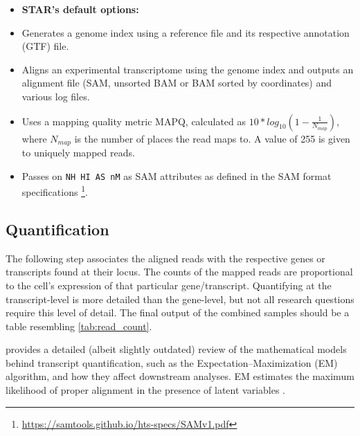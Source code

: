 
\begin{itemize}\itemsep0em
\item[] \textbf{STAR's default options:}
\item Generates a genome index using a reference file and its respective annotation (GTF) file.
\item Aligns an experimental transcriptome using the genome index and outputs an alignment file (SAM, unsorted BAM or BAM sorted by coordinates) and various log files.
\item Uses a mapping quality metric MAPQ, calculated as $10*log_{10}(1-\frac{1}{N_{map}})$, where ${N_{map}}$ is the number of places the read maps to. A value of 255 is given to uniquely mapped reads.
\item Passes on \texttt{NH HI AS nM} as SAM attributes as defined in the SAM format specifications \footnote{\url{https://samtools.github.io/hts-specs/SAMv1.pdf}}.
\end{itemize}


\subsection{Quantification}
\label{quantification}
The following step associates the aligned reads with the respective genes or transcripts found at their locus. The counts of the mapped reads are proportional to the cell's expression of that particular gene/transcript. Quantifying at the transcript-level is more detailed than the gene-level, but not all research questions require this level of detail. The final output of the combined samples should be a table resembling \autoref{tab:read_count}.

\cite{pachter2011models} provides a detailed (albeit slightly outdated) review of the mathematical models behind transcript quantification, such as the Expectation–Maximization (EM) algorithm, and how they affect downstream analyses. EM estimates the maximum likelihood of proper alignment in the presence of latent variables \citep{brownlee2019gentle, pachter2011models}.

